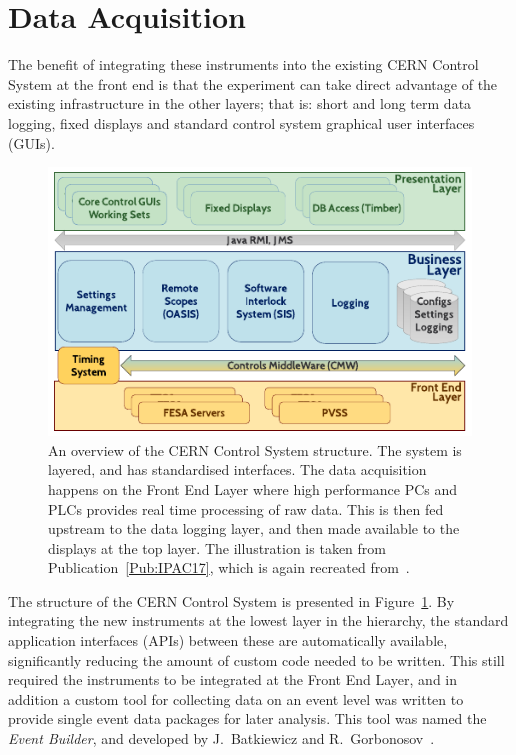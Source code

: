 \section{Data Acquisition}
\label{DAQ:DAQ}

The benefit of integrating these instruments into the existing CERN Control System at the front end is that the experiment can take direct advantage of the existing infrastructure in the other layers; that is: short and long term data logging, fixed displays and standard control system graphical user interfaces (GUIs).

\begin{figure}[hbt]
    \centering
    \includegraphics[width=0.85\linewidth,trim={0mm 0mm 0mm 0mm},clip]{figures/CERNControls}
    \caption{\label{Fig:DAQ:CERN}
        An overview of the CERN Control System structure.
        The system is layered, and has standardised interfaces.
        The data acquisition happens on the Front End Layer where high performance PCs and PLCs provides real time processing of raw data.
        This is then fed upstream to the data logging layer, and then made available to the displays at the top layer.
        The illustration is taken from Publication~\ref{Pub:IPAC17}, which is again recreated from~\cite{add:gorbonosov:2013}.
    }
\end{figure}

The structure of the CERN Control System is presented in Figure~\ref{Fig:DAQ:CERN}.
By integrating the new instruments at the lowest layer in the hierarchy, the standard application interfaces (APIs) between these are automatically available, significantly reducing the amount of custom code needed to be written.
This still required the instruments to be integrated at the Front End Layer, and in addition a custom tool for collecting data on an event level was written to provide single event data packages for later analysis.
This tool was named the \textit{Event Builder}, and developed by J.~Batkiewicz and R.~Gorbonosov~\cite{add:gessner:2018}.

